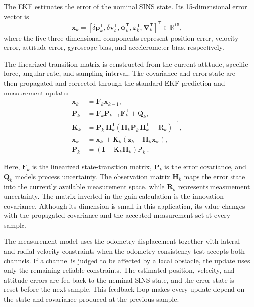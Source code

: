 \documentclass[research]{fcs}
\begin{document}
The EKF estimates the error of the nominal SINS state. Its 15-dimensional error vector is
\begin{equation}
  \mathbf{x}_k =
  [\delta\mathbf{p}_k^{\mathsf T},
   \delta\mathbf{v}_k^{\mathsf T},
   \boldsymbol{\phi}_k^{\mathsf T},
   \boldsymbol{\varepsilon}_k^{\mathsf T},
   \boldsymbol{\nabla}_k^{\mathsf T}]^{\mathsf T}
  \in \mathbb{R}^{15},
  \label{eq:error-state}
\end{equation}
where the five three-dimensional components represent position error, velocity error, attitude error, gyroscope bias, and accelerometer bias, respectively.

The linearized transition matrix is constructed from the current attitude, specific force, angular rate, and sampling interval. The covariance and error state are then propagated and corrected through the standard EKF prediction and measurement update:
\begin{align}
  \mathbf{x}_{k}^{-} &= \mathbf{F}_k\mathbf{x}_{k-1}, \\
  \mathbf{P}_{k}^{-} &= \mathbf{F}_k\mathbf{P}_{k-1}\mathbf{F}_k^{\mathsf T}+\mathbf{Q}_k, \\
  \mathbf{K}_k &= \mathbf{P}_{k}^{-}\mathbf{H}_k^{\mathsf T}
  (\mathbf{H}_k\mathbf{P}_{k}^{-}\mathbf{H}_k^{\mathsf T}+\mathbf{R}_k)^{-1}, \\
  \mathbf{x}_k &= \mathbf{x}_{k}^{-}+\mathbf{K}_k
  (\mathbf{z}_k-\mathbf{H}_k\mathbf{x}_{k}^{-}), \\
  \mathbf{P}_k &= (\mathbf{I}-\mathbf{K}_k\mathbf{H}_k)\mathbf{P}_{k}^{-}.
  \label{eq:ekf-update}
\end{align}

Here, $\mathbf{F}_k$ is the linearized state-transition matrix, $\mathbf{P}_k$ is the error covariance, and $\mathbf{Q}_k$ models process uncertainty. The observation matrix $\mathbf{H}_k$ maps the error state into the currently available measurement space, while $\mathbf{R}_k$ represents measurement uncertainty. The matrix inverted in the gain calculation is the innovation covariance. Although its dimension is small in this application, its value changes with the propagated covariance and the accepted measurement set at every sample.

The measurement model uses the odometry displacement together with lateral and radial velocity constraints when the odometry consistency test accepts both channels. If a channel is judged to be affected by a local obstacle, the update uses only the remaining reliable constraints. The estimated position, velocity, and attitude errors are fed back to the nominal SINS state, and the error state is reset before the next sample. This feedback loop makes every update depend on the state and covariance produced at the previous sample.
\end{document}
